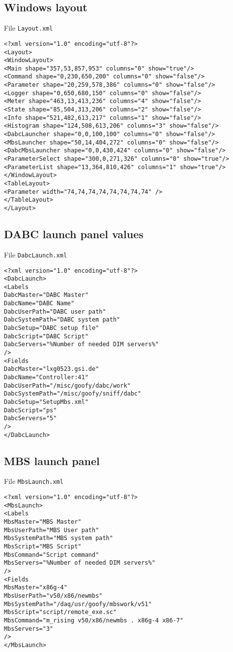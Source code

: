 \subsection{Windows layout}
File {\tt Layout.xml}
\begin{verbatim}
<?xml version="1.0" encoding="utf-8"?>
<Layout>
<WindowLayout>
<Main shape="357,53,857,953" columns="0" show="true"/>
<Command shape="0,230,650,200" columns="0" show="false"/>
<Parameter shape="20,259,578,386" columns="0" show="false"/>
<Logger shape="0,650,680,150" columns="0" show="false"/>
<Meter shape="463,13,413,236" columns="4" show="false"/>
<State shape="85,504,313,206" columns="2" show="false"/>
<Info shape="521,482,613,217" columns="1" show="false"/>
<Histogram shape="124,508,613,206" columns="3" show="false"/>
<DabcLauncher shape="0,0,100,100" columns="0" show="false"/>
<MbsLauncher shape="50,14,404,272" columns="0" show="false"/>
<DabcMbsLauncher shape="0,0,430,424" columns="0" show="false"/>
<ParameterSelect shape="300,0,271,326" columns="0" show="true"/>
<ParameterList shape="13,364,810,426" columns="1" show="true"/>
</WindowLayout>
<TableLayout>
<Parameter width="74,74,74,74,74,74,74,74" />
</TableLayout>
</Layout>
\end{verbatim}
\subsection{DABC launch panel values}
File {\tt DabcLaunch.xml}
\begin{verbatim}
<?xml version="1.0" encoding="utf-8"?>
<DabcLaunch>
<Labels
DabcMaster="DABC Master"
DabcName="DABC Name"
DabcUserPath="DABC user path"
DabcSystemPath="DABC system path"
DabcSetup="DABC setup file"
DabcScript="DABC Script"
DabcServers="%Number of needed DIM servers%"
/>
<Fields
DabcMaster="lxg0523.gsi.de"
DabcName="Controller:41"
DabcUserPath="/misc/goofy/dabc/work"
DabcSystemPath="/misc/goofy/sniff/dabc"
DabcSetup="SetupMbs.xml"
DabcScript="ps"
DabcServers="5"
/>
</DabcLaunch>
\end{verbatim}
\subsection{MBS launch panel}
File {\tt MbsLaunch.xml}
\begin{verbatim}
<?xml version="1.0" encoding="utf-8"?>
<MbsLaunch>
<Labels
MbsMaster="MBS Master"
MbsUserPath="MBS User path"
MbsSystemPath="MBS system path"
MbsScript="MBS Script"
MbsCommand="Script command"
MbsServers="%Number of needed DIM servers%"
/>
<Fields
MbsMaster="x86g-4"
MbsUserPath="v50/x86/newmbs"
MbsSystemPath="/daq/usr/goofy/mbswork/v51"
MbsScript="script/remote_exe.sc"
MbsCommand="m_rising v50/x86/newmbs . x86g-4 x86-7"
MbsServers="3"
/>
</MbsLaunch>
\end{verbatim}
